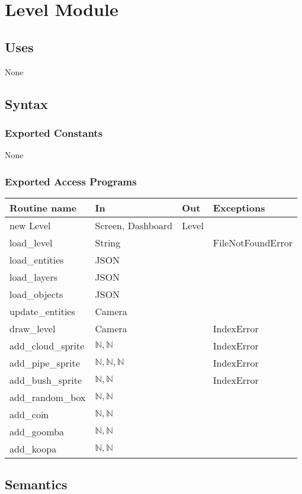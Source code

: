 \documentclass[12pt]{article}
\begin{document}
\newpage

\section*{Level Module}
\subsection*{Uses}
None
\subsection*{Syntax}
\subsubsection*{Exported Constants}
None
\subsubsection*{Exported Access Programs}
\begin{tabular}{| l | l | l | p{5cm} |}
\hline
\textbf{Routine name} & \textbf{In} & \textbf{Out} & \textbf{Exceptions}\\
\hline
new Level & Screen, Dashboard & Level & \\
\hline
load\_level & String & & FileNotFoundError\\
\hline
load\_entities & JSON &  & \\
\hline
load\_layers & JSON & & \\
\hline
load\_objects & JSON & &\\
\hline
update\_entities & Camera & &\\
\hline
draw\_level & Camera & & IndexError\\
\hline
add\_cloud\_sprite & $\mathbb{N}, \mathbb{N}$ & & IndexError\\
\hline
add\_pipe\_sprite  & $\mathbb{N}, \mathbb{N}, \mathbb{N}$ & & IndexError\\
\hline
add\_bush\_sprite & $\mathbb{N}, \mathbb{N}$ & & IndexError\\
\hline
add\_random\_box & $\mathbb{N}, \mathbb{N}$ & & \\
\hline
add\_coin & $\mathbb{N}, \mathbb{N}$ & &\\
\hline
add\_goomba & $\mathbb{N}, \mathbb{N}$ & &\\
\hline
add\_koopa & $\mathbb{N}, \mathbb{N}$ & &\\
\hline
\end{tabular}

\subsection*{Semantics}
\end{document}
